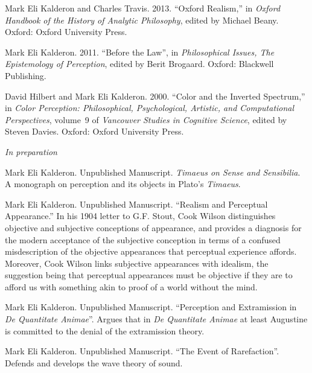 \documentclass[11pt]{article}
\begin{document}
\ind Mark Eli Kalderon and Charles Travis. 2013. ``Oxford Realism,''  in \emph{Oxford Handbook of the History of Analytic Philosophy}, edited by Michael Beany. Oxford: Oxford University Press.

\ind Mark Eli Kalderon. 2011. ``Before the Law'', in \emph{Philosophical Issues, The Epistemology of Perception}, edited by Berit Brogaard. Oxford: Blackwell Publishing.

\ind David Hilbert and Mark Eli Kalderon. 2000. ``Color and the Inverted Spectrum,'' in \emph{Color Perception: Philosophical, Psychological, Artistic, and Computational Perspectives}, volume~9 of \emph{Vancouver Studies in Cognitive Science}, edited by Steven Davies. Oxford: Oxford University Press.


\bigskip 

 
\noindent\emph{In preparation \vspace{0.05in}}


\ind Mark Eli Kalderon. Unpublished Manuscript. \emph{Timaeus on Sense and Sensibilia}. A monograph on perception and its objects in Plato's \emph{Timaeus}.

\ind Mark Eli Kalderon. Unpublished Manuscript. ``Realism and Perceptual Appearance.'' In his 1904 letter to G.F. Stout, Cook Wilson distinguishes objective and subjective conceptions of appearance, and provides a diagnosis for the modern acceptance of the subjective conception in terms of a confused misdescription of the objective appearances that perceptual experience affords. Moreover, Cook Wilson links subjective appearances with idealism, the suggestion being that perceptual appearances must be objective if they are to afford us with something akin to proof of a world without the mind.

\ind Mark Eli Kalderon. Unpublished Manuscript. ``Perception and Extramission in \emph{De Quantitate Animae}''. Argues that in \emph{De Quantitate Animae} at least Augustine is committed to the denial of the extramission theory. 

\ind Mark Eli Kalderon. Unpublished Manuscript. ``The Event of Rarefaction''. Defends and develops the wave theory of sound.

 \bigskip
\end{document}
